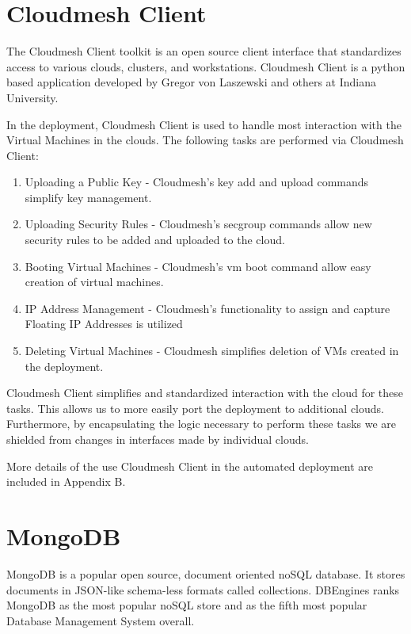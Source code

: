 \documentclass[9pt,twocolumn,twoside]{styles/osajnl}
\begin{document}
\section{Cloudmesh Client}

The Cloudmesh Client toolkit is an open source client interface that standardizes access to various clouds, clusters, and workstations. \cite{www-cloudmesh}  Cloudmesh Client is a python based application developed by Gregor von Laszewski and others at Indiana University.

In the deployment, Cloudmesh Client is used to handle most interaction with the Virtual Machines in the clouds.  The following tasks are performed via Cloudmesh Client:

\vspace{-\topsep}
\begin{enumerate}
\item Uploading a Public Key - Cloudmesh's key add and upload commands simplify key management.
\item Uploading Security Rules - Cloudmesh's secgroup commands allow new security rules to be added and uploaded to the cloud.
\item Booting Virtual Machines - Cloudmesh's vm boot command allow easy creation of virtual machines.
\item IP Address Management - Cloudmesh's functionality to assign and capture Floating IP Addresses is utilized
\item Deleting Virtual Machines - Cloudmesh simplifies deletion of VMs created in the deployment.
\end{enumerate}
\vspace{-\topsep}

Cloudmesh Client simplifies and standardized interaction with the cloud for these tasks.  This allows us to more easily port the deployment to additional clouds.  Furthermore, by encapsulating the logic necessary to perform these tasks we are shielded from changes in interfaces made by individual clouds.

More details of the use Cloudmesh Client in the automated deployment are included in Appendix B.

\section{MongoDB}

MongoDB is a popular open source, document oriented noSQL database.  It stores documents in JSON-like schema-less formats called collections. \cite{www-MonWiki}  DBEngines ranks MongoDB as the most popular noSQL store and as the fifth most popular Database Management System overall. \cite{www-dbEngines}
\end{document}
